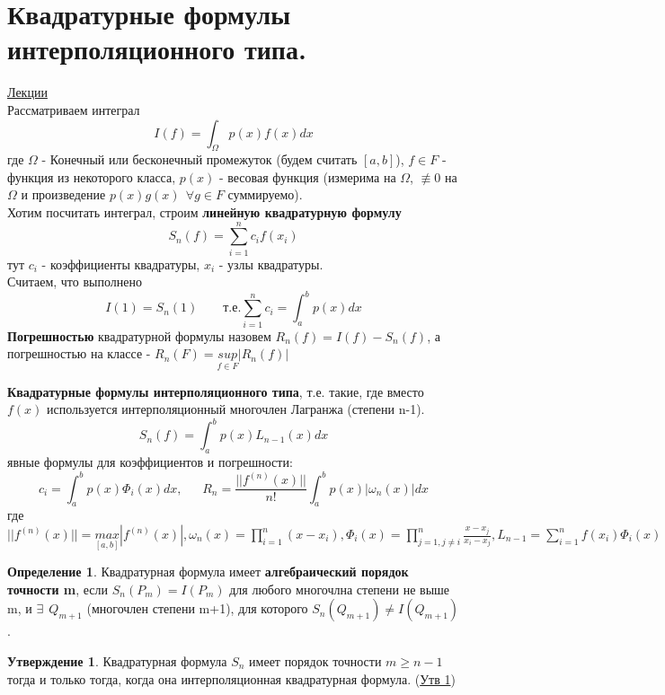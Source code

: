 \documentclass[specialist, subf, href, colorlinks=true, 12pt, times, mtpro, final]{disser}
\theoremstyle{definition}
\newtheorem{defn}{Определение}[section]
\newtheorem{state}{Утверждение}[section]
\begin{document}
\section {Квадратурные формулы интерполяционного типа.}
    \hyperlink {lects.37}{Лекции}\\
    Рассматриваем интеграл
    $$
        I(f) = \int_{\Omega}p(x)f(x)dx
    $$
    где $\Omega$ - Конечный или бесконечный промежуток (будем считать $[a,b]$), $f \in F$ - функция из некоторого класса, $p(x)$ - весовая функция (измерима на $\Omega$, $\not\equiv 0$ на $\Omega$ и произведение $p(x)g(x) \ \ \forall g \in F$ суммируемо). \\
    Хотим посчитать интеграл, строим \textbf{линейную квадратурную формулу}
    $$
        S_n(f) = \sum\limits_{i = 1}^{n} c_if(x_i)
    $$
    тут $c_i$ - коэффициенты квадратуры, $x_i$ - узлы квадратуры.\\
    Считаем, что выполнено 
    $$
        I(1) = S_n(1) \ \ \ \ \ \ \ \ \ \text{т.е.} \sum\limits_{i = 1}^n c_i = \int_a^b p(x) dx
    $$
    \textbf{Погрешностью} квадратурной формулы назовем $R_n(f) = I(f) - S_n(f)$, а погрешностью на классе - $R_n(F) = \underset{f\in F}{sup} |R_n(f)|$
    
    \textbf{Квадратурные формулы интерполяционного типа}, т.е. такие, где вместо $f(x)$ используется интерполяционный многочлен Лагранжа (степени n-1).
    $$
        S_n(f) = \int_a^b p(x) L_{n-1}(x) dx
    $$
    явные формулы для коэффициентов и погрешности:
    $$
        c_i = \int_a^b p(x)\Phi_i (x) dx, \ \ \ \ \ \ \ R_n = \frac{||f^{(n)}(x)||}{n!} \int_a^b p(x)|\omega_n(x)| dx
    $$
    где $||f^{(n)}(x)|| = \underset{[a,b]}{max}|f^{(n)}(x)|, \omega_n(x) = \prod\limits_{i = 1}^n (x - x_i), \Phi_i(x) = \prod\limits_{j = 1, j\ne i}^n \frac{x - x_j}{x_i - x_j}, L_{n-1} = \sum\limits_{i = 1}^n f(x_i) \Phi_i(x)$ \\
    
    \begin{defn}
        Квадратурная формула имеет \textbf{алгебраический порядок точности  m}, если $S_n(P_m) = I(P_m)$ для любого многочлна степени не выше m, и $\exists \ \ Q_{m+1}$ (многочлен степени m+1), для которого $S_n(Q_{m+1}) \ne I(Q_{m+1})$. 
    \end{defn}
    \begin{state}
        Квадратурная формула $S_n$ имеет порядок точности $m \ge n-1$ тогда и только тогда, когда она интерполяционная квадратурная формула. (\hyperlink {lects.38}{Утв 1})
    \end{state}
\end{document}

